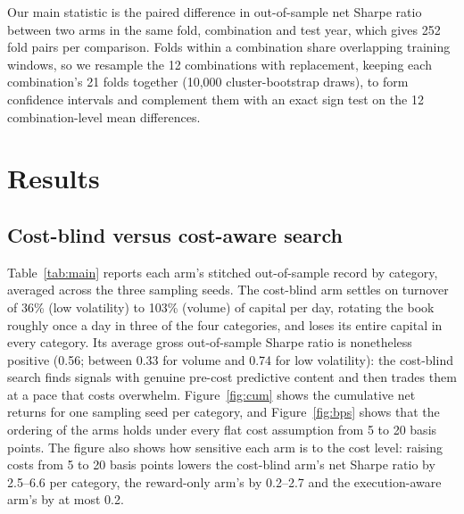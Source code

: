 \documentclass[preprint,12pt,authoryear]{elsarticle}
\begin{document}
Our main statistic is the paired difference in out-of-sample net Sharpe ratio between two arms in the same fold, combination and test year, which gives 252 fold pairs per comparison. Folds within a combination share overlapping training windows, so we resample the 12 combinations with replacement, keeping each combination's 21 folds together (10,000 cluster-bootstrap draws), to form confidence intervals and complement them with an exact sign test on the 12 combination-level mean differences.

\section{Results}\label{sec:results}

\subsection{Cost-blind versus cost-aware search}\label{sec:main}

Table~\ref{tab:main} reports each arm's stitched out-of-sample record by category, averaged across the three sampling seeds. The cost-blind arm settles on turnover of 36\% (low volatility) to 103\% (volume) of capital per day, rotating the book roughly once a day in three of the four categories, and loses its entire capital in every category. Its average gross out-of-sample Sharpe ratio is nonetheless positive (0.56; between 0.33 for volume and 0.74 for low volatility): the cost-blind search finds signals with genuine pre-cost predictive content and then trades them at a pace that costs overwhelm. Figure~\ref{fig:cum} shows the cumulative net returns for one sampling seed per category, and Figure~\ref{fig:bps} shows that the ordering of the arms holds under every flat cost assumption from 5 to 20 basis points. The figure also shows how sensitive each arm is to the cost level: raising costs from 5 to 20 basis points lowers the cost-blind arm's net Sharpe ratio by 2.5--6.6 per category, the reward-only arm's by 0.2--2.7 and the execution-aware arm's by at most 0.2.
\end{document}
